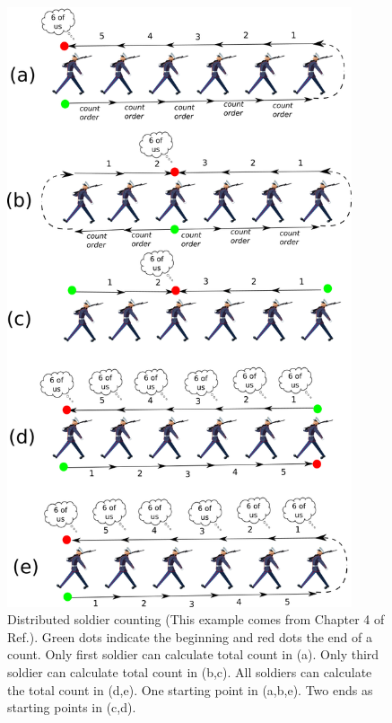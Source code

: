 \begin{figure}[h!]
\centering
\includegraphics[width=4in]
{mpass/soldiers.png}
\caption{Distributed soldier counting 
(This example
comes from Chapter 4 of
Ref.\cite{pearl-1988book}). 
Green dots indicate the
beginning and red dots the end
of a count. Only
first soldier can calculate
total count in (a). Only 
third soldier can calculate total count
in (b,c). 
All soldiers can calculate
the total count in 
(d,e). One starting point
in (a,b,e).
Two ends as starting points
in (c,d).
} 
\label{fig-soldiers}
\end{figure}


